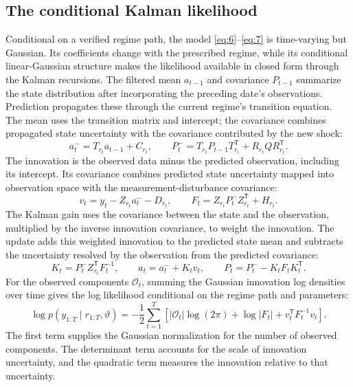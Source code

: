 \documentclass[11pt]{article}
\begin{document}
\subsection{The conditional Kalman likelihood}\label{sec:linear-kalman}

Conditional on a verified regime path, the model \eqref{eq:6}--\eqref{eq:7} is time-varying but Gaussian. Its coefficients change with the prescribed regime, while its conditional linear-Gaussian structure makes the likelihood available in closed form through the Kalman recursions. The filtered mean \(a_{t-1}\) and covariance \(P_{t-1}\) summarize the state distribution after incorporating the preceding date's observations. Prediction propagates these through the current regime's transition equation. The mean uses the transition matrix and intercept; the covariance combines propagated state uncertainty with the covariance contributed by the new shock:
\begin{equation}\label{eq:8}
 a_t^- =T_{r_t}a_{t-1}+C_{r_t},
\qquad
 P_t^- =T_{r_t}P_{t-1}T_{r_t}^{\mathsf T}+R_{r_t}QR_{r_t}^{\mathsf T}.
\end{equation}
The innovation is the observed data minus the predicted observation, including its intercept. Its covariance combines predicted state uncertainty mapped into observation space with the measurement-disturbance covariance:
\begin{equation}\label{eq:9}
 v_t=y_t-Z_{r_t}a_t^- -D_{r_t},
 \qquad
 F_t=Z_{r_t}P_t^-Z_{r_t}^{\mathsf T}+H_{r_t}.
\end{equation}
The Kalman gain uses the covariance between the state and the observation, multiplied by the inverse innovation covariance, to weight the innovation. The update adds this weighted innovation to the predicted state mean and subtracts the uncertainty resolved by the observation from the predicted covariance:
\begin{equation}\label{eq:10}
 K_t=P_t^-Z_{r_t}^{\mathsf T}F_t^{-1},\qquad
 a_t=a_t^-+K_tv_t,\qquad
 P_t=P_t^- -K_tF_tK_t^{\mathsf T}.
\end{equation}
For the observed components \(\mathcal O_t\), summing the Gaussian innovation log densities over time gives the log likelihood conditional on the regime path and parameters:
\begin{equation}\label{eq:11}
 \log p(y_{1:T}\mid r_{1:T},\vartheta)
 =-\frac12\sum_{t=1}^T
 \left[|\mathcal O_t|\log(2\pi)+\log|F_t|+v_t^{\mathsf T}F_t^{-1}v_t\right].
\end{equation}
The first term supplies the Gaussian normalization for the number of observed components. The determinant term accounts for the scale of innovation uncertainty, and the quadratic term measures the innovation relative to that uncertainty.
\end{document}
